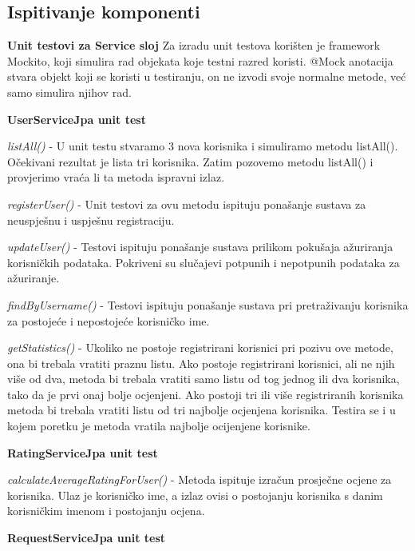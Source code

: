 	
			
			\subsection{Ispitivanje komponenti}

			\textbf{Unit testovi za Service sloj}
			\bigskip
			\newline
			Za izradu unit testova korišten je framework Mockito, koji simulira rad objekata koje testni razred koristi.  
			 @Mock anotacija stvara objekt koji se koristi u testiranju, on ne izvodi svoje normalne metode, već samo simulira njihov rad.
			\bigskip
			\bigskip
			
			\bigskip
			\textbf{UserServiceJpa unit test}
			\bigskip
			
			\textit{listAll()} - U unit testu stvaramo 3 nova korisnika i simuliramo metodu listAll(). Očekivani rezultat je lista tri korisnika. Zatim pozovemo metodu listAll() i provjerimo vraća li ta metoda ispravni izlaz.
			
			\textit{registerUser()} - Unit testovi za ovu metodu ispituju ponašanje sustava za neuspješnu i uspješnu registraciju.
			
			\textit{updateUser()} - Testovi ispituju ponašanje sustava prilikom pokušaja ažuriranja korisničkih podataka. Pokriveni su slučajevi potpunih i nepotpunih podataka za ažuriranje.
			
			\textit{findByUsername()} - Testovi ispituju ponašanje sustava pri pretraživanju korisnika za postojeće i nepostojeće korisničko ime.
			
			\textit{getStatistics()} - Ukoliko ne postoje registrirani korisnici pri pozivu ove metode, ona bi trebala vratiti praznu listu. Ako postoje registrirani korisnici, ali ne njih više od dva, metoda bi trebala vratiti samo listu od tog jednog ili dva korisnika, tako da je prvi onaj bolje ocjenjeni. Ako postoji tri ili više registriranih korisnika metoda bi trebala vratiti listu od tri najbolje ocjenjena korisnika. Testira se i u kojem poretku je metoda vratila najbolje ocijenjene korisnike.
			
			\bigskip
			\bigskip
			\textbf{RatingServiceJpa unit test}
			\bigskip
			
			\textit{calculateAverageRatingForUser()} - Metoda ispituje  izračun prosječne ocjene za korisnika. Ulaz je korisničko ime, a izlaz ovisi o postojanju korisnika s danim korisničkim imenom i postojanju ocjena.
			
			\bigskip
			\bigskip
			\textbf{RequestServiceJpa unit test}
			\bigskip
			
